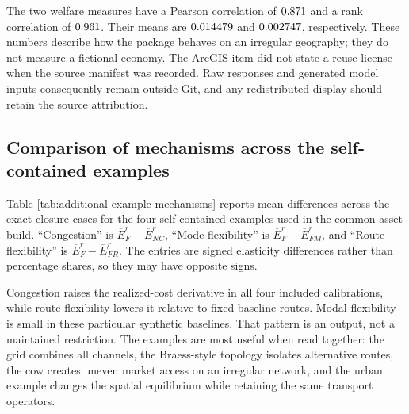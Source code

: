 The two welfare measures have a Pearson correlation of
\(0.871\) and a rank correlation of
\(0.961\). Their means are
\(0.014479\) and
\(0.002747\), respectively. These numbers describe how the
package behaves on an irregular geography; they do not measure a fictional
economy. The ArcGIS item did not state a reuse license when the source manifest
was recorded. Raw responses and generated model inputs consequently remain
outside Git, and any redistributed display should retain the source
attribution.

\subsection{Comparison of mechanisms across the self-contained examples}

Table \ref{tab:additional-example-mechanisms} reports mean differences across
the exact closure cases for the four self-contained examples used in the
common asset build. ``Congestion'' is
\(\overline E_F^r-\overline E_{NC}^r\), ``Mode flexibility'' is
\(\overline E_F^r-\overline E_{FM}^r\), and ``Route flexibility'' is
\(\overline E_F^r-\overline E_{FR}^r\). The entries are signed elasticity
differences rather than percentage shares, so they may have opposite signs.

\begin{table}[H]
\centering
\small
\caption{Mean welfare differences across self-contained examples}
\label{tab:additional-example-mechanisms}

\end{table}

Congestion raises the realized-cost derivative in all four included
calibrations, while route flexibility lowers it relative to fixed baseline
routes. Modal flexibility is small in these particular synthetic baselines.
That pattern is an output, not a maintained restriction. The examples are
most useful when read together: the grid combines all channels, the
Braess-style topology isolates alternative routes, the cow creates uneven
market access on an irregular network, and the urban example changes the
spatial equilibrium while retaining the same transport operators.
